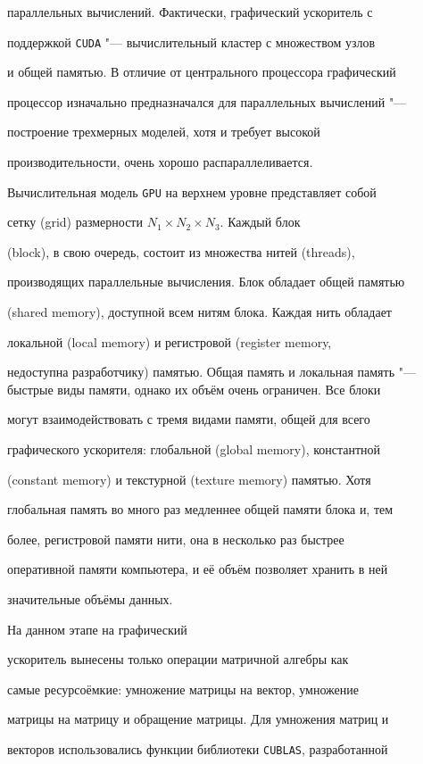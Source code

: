 параллельных вычислений. Фактически, графический ускоритель с

поддержкой {\tt CUDA} "--- вычислительный кластер с множеством узлов

и общей памятью. В отличие от центрального процессора графический

процессор изначально предназначался для параллельных вычислений "---

построение трехмерных моделей, хотя и требует высокой

производительности, очень хорошо распараллеливается.

Вычислительная модель {\tt GPU} на верхнем уровне представляет собой

сетку (grid) размерности $N_1 \times N_2 \times N_3$. Каждый блок

(block), в свою очередь, состоит из множества нитей (threads),

производящих параллельные вычисления. Блок обладает общей памятью

(shared memory), доступной всем нитям блока. Каждая нить обладает

локальной (local memory) и регистровой (register memory,

недоступна разработчику) памятью. Общая память и локальная память "--- быстрые виды памяти, однако их объём очень ограничен. Все блоки

могут взаимодействовать с тремя видами памяти, общей для всего

графического ускорителя: глобальной (global memory), константной

(constant memory) и текстурной (texture memory) памятью. Хотя

глобальная память во много раз медленнее общей памяти блока и, тем

более, регистровой памяти нити, она в несколько раз быстрее

оперативной памяти компьютера, и её объём позволяет хранить в ней

значительные объёмы данных. 

На данном этапе на графический

ускоритель вынесены только операции матричной алгебры  как

самые ресурсоёмкие:  умножение матрицы на вектор, умножение

матрицы на матрицу и обращение матрицы. Для умножения матриц и

векторов использовались функции библиотеки {\tt CUBLAS}, разработанной

